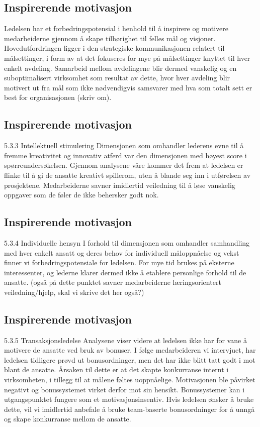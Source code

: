 \subsection{Inspirerende motivasjon}
Ledelsen har et forbedringspotensial i henhold til å inspirere og motivere medarbeiderne gjennom å skape tilhørighet til felles mål og visjoner. Hovedutfordringen ligger i den strategiske kommunikasjonen relatert til målsettinger, i form av at det fokuseres for mye på målsettinger knyttet til hver enkelt avdeling. Samarbeid mellom avdelingene blir dermed vanskelig og en suboptimalisert virksomhet som resultat av dette, hvor hver avdeling blir motivert ut fra mål som ikke nødvendigvis samsvarer med hva som totalt sett er best for organisasjonen (skriv om).  

\subsection{Inspirerende motivasjon}
5.3.3 Intellektuell stimulering
Dimensjonen som omhandler lederens evne til å fremme kreativitet og innovativ atferd var den dimensjonen med høyest score i spørreundersøkelsen. Gjennom analysene våre kommer det frem at ledelsen er flinke til å gi de ansatte kreativt spillerom, uten å blande seg inn i utførelsen av prosjektene. Medarbeiderne savner imidlertid veiledning til å løse vanskelig oppgaver som de føler de ikke behersker godt nok.

\subsection{Inspirerende motivasjon}
5.3.4 Individuelle hensyn
I forhold til dimensjonen som omhandler samhandling med hver enkelt ansatt og deres behov for individuell måloppnåelse og vekst finner vi forbedringspotensiale for ledelsen. For mye tid brukes på eksterne interessenter, og lederne klarer dermed ikke å etablere personlige forhold til de ansatte. (også på dette punktet savner medarbeiderne læringsorientert veiledning/hjelp, skal vi skrive det her også?)

\subsection{Inspirerende motivasjon}
5.3.5 Transaksjonsledelse 
Analysene viser videre at ledelsen ikke har for vane å motivere de ansatte ved bruk av bonuser. I følge medarbeideren vi intervjuet, har ledelsen tidligere prøvd ut bonusordninger, men det har ikke blitt tatt godt i mot blant de ansatte.  Årsaken til dette er at det skapte konkurranse internt i virksomheten, i tillegg til at målene føltes uoppnåelige. Motivasjonen ble påvirket negativt og bonussystemet virket derfor mot sin hensikt. Bonussystemer kan i utgangspunktet fungere som et motivasjonsinsentiv. Hvis ledelsen ønsker å bruke dette, vil vi imidlertid anbefale å bruke team-baserte bonusordninger for å unngå og skape konkurranse mellom de ansatte.

